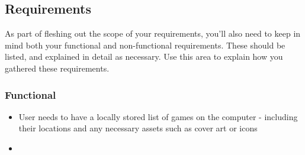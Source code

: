 \documentclass[10pt,conference,onecolumn,compsoc]{IEEEtran}
\begin{document}
\subsection{Requirements}
As part of fleshing out the scope of your requirements, you'll also need to keep in mind both your functional and non-functional requirements.  These should be listed, and explained in detail as necessary.  Use this area to explain how you gathered these requirements.

\subsubsection{Functional}

\begin{itemize}
\item User needs to have a locally stored list of games on the computer - including their locations and any necessary assets such as cover art or icons
\item 
\end{itemize}

%
%
%
\end{document}
